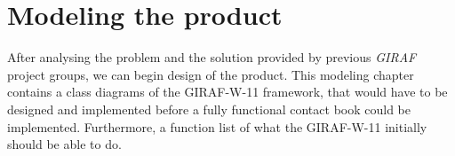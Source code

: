 \chapter{Modeling the product}
After analysing the problem and the solution provided by previous \emph{GIRAF} project groups, we can begin design of the product.
This modeling chapter contains a class diagrams of the GIRAF-W-11 framework, that would have to be designed and implemented before a fully functional contact book could be implemented. Furthermore, a function list of what the GIRAF-W-11 initially should be able to do.
